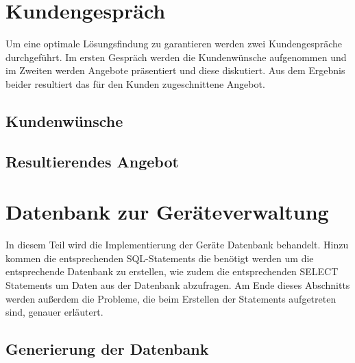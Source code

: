 \documentclass{article}
\begin{document}
\section{Kundengespräch}
Um eine optimale Lösungsfindung zu garantieren werden zwei Kundengespräche durchgeführt. Im ersten Gespräch werden die Kundenwünsche aufgenommen und im Zweiten werden Angebote präsentiert und diese diskutiert. Aus dem Ergebnis beider resultiert das für den Kunden zugeschnittene Angebot. 
\subsection{Kundenwünsche}
\subsection{Resultierendes Angebot}
\section{Datenbank zur Geräteverwaltung}
In diesem Teil wird die Implementierung der Geräte Datenbank behandelt. Hinzu kommen die entsprechenden SQL-Statements die benötigt werden um die entsprechende Datenbank zu erstellen, wie zudem die entsprechenden SELECT Statements um Daten aus der Datenbank abzufragen. Am Ende dieses Abschnitts werden außerdem die Probleme, die beim Erstellen der Statements aufgetreten sind, genauer erläutert.
\newpage
\subsection{Generierung der Datenbank}
\end{document}
